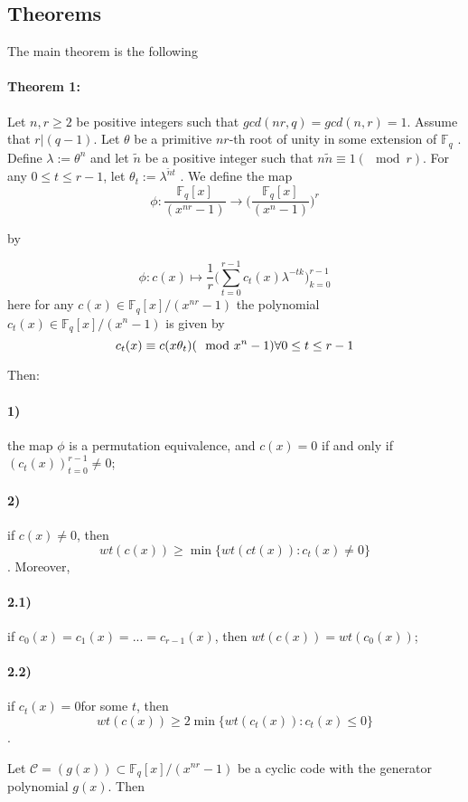 \documentclass[fontsize=12pt]{article}
\begin{document}
\subsection{Theorems}
The main theorem is the
following
\paragraph{Theorem 1:}
Let $n, r \geq 2$ be positive integers such that
$gcd(nr, q) = gcd(n, r ) = 1$. Assume that $r |(q −1)$. Let $\theta$ be a
primitive $nr$-th root of unity in some extension of $\mathbb{F}_q$ . Define
$\lambda := \theta^n$ and let $\tilde n$ be a positive integer such that $n \tilde n\equiv 1(\mod r )$. For any $0 \leq t\leq r-1$,
 let $\theta_t := \lambda^{\tilde nt}$ . We define the
map
$$ \phi : \frac{\mathbb{F}_q[x]}{(x^{nr}-1)} \rightarrow \Big ( \frac{\mathbb{F}_q[x]}{(x^{n}-1)} \Big )^r$$

by 

$$ \phi : c(x) \mapsto \frac{1}{r} \Big ( \sum_{t=0}^{r-1} c_t(x)\lambda^{-tk}\Big)_{k=0}^{r-1}$$ 
here for any $c(x) \in \mathbb{F}_q[x]/(x^{nr}-1)$ the polynomial $c_t (x) \in
 \mathbb{F}_q[x]/(x^{n}-1)$ is given by
$$c_t (x) \equiv c(x\theta_t) (\mod x^n - 1)\\  \forall 0 \leq t \leq r-1$$

Then:

\paragraph{1)} the map $\phi$ is a permutation equivalence, and $c(x) 
= 0$ if
and only if $(c_t (x))^{r-1}_{t=0}\neq 0$;
\paragraph{2)} if $c(x)\neq 0$, then
$$wt(c(x)) \geq \min \{wt(ct (x)) : c_t (x) 
\neq 0\}$$.
Moreover,
\paragraph{2.1)} if $c_0(x) = c_1(x) = ... = c_{r−1}(x)$, then $wt(c(x)) =
wt(c_0(x))$;
\paragraph{2.2)} if $c_t (x) = 0 $for some $t$, then
$$wt(c(x)) \geq 2 \min \{wt(c_t (x)) : c_t (x) 
\leq 0\}$$.

Let $\mathcal{C} = (g(x)) \subset \mathbb{F}_q[x]/(x^{nr} − 1)$ be a cyclic code with the
generator polynomial $g(x)$. Then
\end{document}
